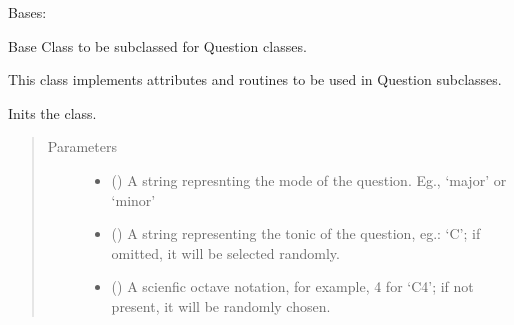 \documentclass[letterpaper,10pt,english]{sphinxmanual}
\begin{document}
\begin{fulllineitems}
\label{\detokenize{birdears:birdears.questionbase.QuestionBase}}
Bases: 

Base Class to be subclassed for Question classes.

This class implements attributes and routines to be used in Question
subclasses.

\begin{fulllineitems}
\label{\detokenize{birdears:birdears.questionbase.QuestionBase.__init__}}
Inits the class.
\begin{quote}\begin{description}
\item[{Parameters}] \leavevmode\begin{itemize}
\item {} 
 () \textendash{} A string represnting the mode of the question.
Eg., ‘major’ or ‘minor’

\item {} 
 () \textendash{} A string representing the tonic of the
question, eg.: ‘C’; if omitted, it will be selected
randomly.

\item {} 
 () \textendash{} A scienfic octave notation, for example,
4 for ‘C4’; if not present, it will be randomly chosen.


\end{itemize}
\end{description}
\end{quote}
\end{fulllineitems}
\end{fulllineitems}
\end{document}
